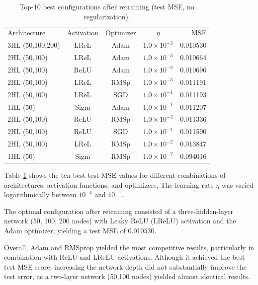\documentclass[amssymb,twocolumn,aps,floatfix]{revtex4-2}
\begin{document}
\begin{table}[h!]
\caption{Top-10 best configurations after retraining (test MSE, no regularization).}
\label{tab:best-no-reg}
\setlength{\tabcolsep}{3pt}
\renewcommand{\arraystretch}{0.95}
\small
\begin{ruledtabular}
\begin{tabular}{l c c c r}
Architecture & Activation & Optimizer & $\eta$ & MSE \\
\colrule
3HL (50,100,200)      & LReL & Adam & $1.0\times10^{-3}$ & 0.010530 \\
2HL (50,100)          & LReL & Adam & $1.0\times10^{-3}$ & 0.010664 \\
2HL (50,100)          & ReLU & Adam & $1.0\times10^{-3}$ & 0.010696 \\
2HL (50,100)          & LReL & RMSp & $1.0\times10^{-3}$ & 0.011191 \\
2HL (50,100)          & LReL & SGD  & $1.0\times10^{-1}$ & 0.011193 \\
1HL (50)              & Sigm & Adam & $1.0\times10^{-1}$ & 0.011207 \\
2HL (50,100)          & ReLU & RMSp & $1.0\times10^{-3}$ & 0.011336 \\
2HL (50,100)          & ReLU & SGD  & $1.0\times10^{-1}$ & 0.011590 \\
2HL (50,100)          & LReL & RMSp & $1.0\times10^{-2}$ & 0.013847 \\
1HL (50)              & Sigm & RMSp & $1.0\times10^{-2}$ & 0.094016 \\
\end{tabular}
\end{ruledtabular}
\end{table}



Table \ref{tab:best-no-reg} shows the ten best test MSE values for different combinations of architectures, activation functions, and optimizers. The learning rate $\eta$ was varied logarithmically between $10^{-4}$ and $10^{-1}$.

The optimal configuration after retraining consisted of a three-hidden-layer network (50, 100, 200 nodes) with Leaky ReLU (LReLU) activation and the Adam optimizer, yielding a test MSE of 0.010530.

Overall, Adam and RMSprop yielded the most competitive results, particularly in combination with ReLU and LReLU activations. Although it achieved the best test MSE score, increasing the network depth did not substantially improve the test error, as a two-layer network (50,100 nodes) yielded almost identical results.  
\end{document}
